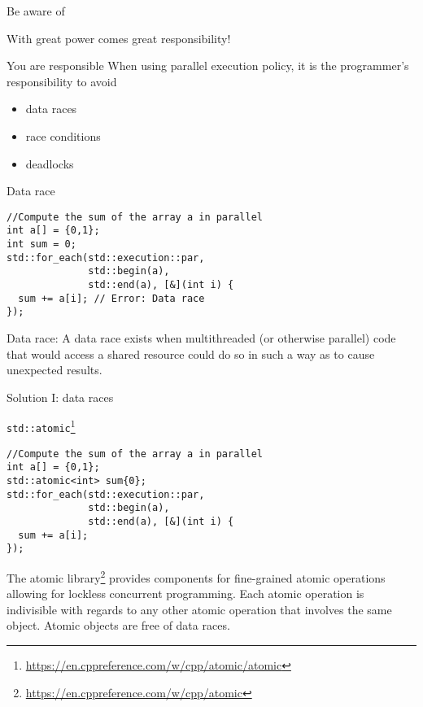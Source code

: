\documentclass[12pt,t]{beamer}
\begin{document}
\begin{frame}{Be aware of}

\begin{center}
With great power comes great responsibility!

\end{center}


\begin{block}{You are responsible}
When using parallel execution policy, it is the programmer's responsibility to avoid
\begin{itemize}
\item data races
\item race conditions
\item deadlocks
\end{itemize} 
\end{block}

\end{frame}

\begin{frame}[fragile]{Data race}

\begin{lstlisting}
//Compute the sum of the array a in parallel
int a[] = {0,1};
int sum = 0;
std::for_each(std::execution::par, 
              std::begin(a), 
              std::end(a), [&](int i) {
  sum += a[i]; // Error: Data race
});
\end{lstlisting}

\begin{block}{Data race:}
A data race exists when multithreaded (or otherwise parallel) code that would access a shared resource could do so in such a way as to cause unexpected results.
\end{block}

\end{frame}

\begin{frame}[fragile]{Solution I: data races}

\begin{block}{\lstinline|std::atomic|\footnote{\tiny\url{https://en.cppreference.com/w/cpp/atomic/atomic}}}
\begin{lstlisting}
//Compute the sum of the array a in parallel
int a[] = {0,1};
std::atomic<int> sum{0};
std::for_each(std::execution::par, 
              std::begin(a), 
              std::end(a), [&](int i) {
  sum += a[i]; 
});
\end{lstlisting}
\end{block}

The atomic library\footnote{\tiny\url{https://en.cppreference.com/w/cpp/atomic}} provides components for fine-grained atomic operations allowing for lockless concurrent programming. Each atomic operation is indivisible with regards to any other atomic operation that involves the same object. Atomic objects are free of data races. 
\end{frame}
\end{document}
